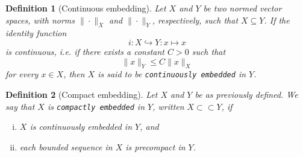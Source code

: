 \documentclass[11pt]{article}
\newtheorem{definition}{Definition}
\theoremstyle{definition}
\begin{document}
\begin{definition}[Continuous embedding]
	Let $X$ and $Y$ be two normed vector spaces, with norms
	$\|\cdot\|_X$ and $\|\cdot\|_Y$, respectively, such that
	$X \subseteq Y$. If the identity function
	\begin{equation*}
		i : X \hookrightarrow Y : x \mapsto x
	\end{equation*}
	is continuous, i.e. if there exists a constant $C > 0$ such that
	\begin{equation*}
		\|x\|_Y \leq C\|x\|_X
	\end{equation*}
	for every $x \in X$, then $X$ is said to be
	\texttt{continuously embedded} in $Y$.
\end{definition}

\begin{definition}[Compact embedding]
	Let $X$ and $Y$ be as previously defined.
	We say that $X$ is \texttt{compactly embedded} in $Y$, written
	$X \subset\subset Y$, if
	\begin{enumerate}[(i)]
		\item $X$ is continuously embedded in $Y$, and
		\item each bounded sequence in $X$ is precompact in $Y$.
	\end{enumerate}
\end{definition}

\newpage
\end{document}
